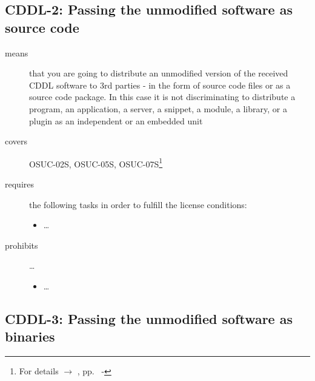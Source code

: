 \subsection{CDDL-2: Passing the unmodified software as source code}
\label{OSUC-02S-CDDL} \label{OSUC-05S-CDDL} \label{OSUC-07S-CDDL} 

\begin{description}

\item[means] that you are going to distribute an unmodified version of the
received CDDL software to 3rd parties - in the form of source code files or as a
source code package. In this case it is not discriminating to distribute a
program, an application, a server, a snippet, a module, a library, or a plugin
as an independent or an embedded unit

\item[covers] OSUC-02S, OSUC-05S, OSUC-07S\footnote{For details $\rightarrow$
\oslic, pp.\ \pageref{OSUC-02S-DEF} - \pageref{OSUC-07S-DEF}}

\item[requires] the following tasks in order to fulfill the license conditions:
\begin{itemize}
  
  \item \ldots
  
\end{itemize}

\item[prohibits] \ldots
\begin{itemize}
  \item \ldots
\end{itemize}
\end{description}


\subsection{CDDL-3: Passing the unmodified software as binaries} 
\label{OSUC-02B-CDDL} \label{OSUC-05B-CDDL} \label{OSUC-07B-CDDL}

